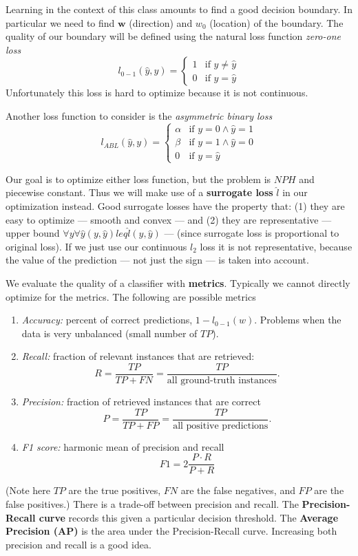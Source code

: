 \documentclass[twoside]{article}
\newcommand\w{\mathbf{w}}
\begin{document}
Learning in the context of this class amounts to find a good decision boundary. In particular we need to find $\w$ (direction) and $w_0$ (location) of the boundary. The quality of our boundary will be defined using the natural loss function \emph{zero-one loss}
\[l_{0-1}(\hat{y}, y) = \begin{cases}
1 & \mbox{if } y \neq \hat{y} \\
0 & \mbox{if } y = \hat{y}
\end{cases}\]
Unfortunately this loss is hard to optimize because it is not continuous. 

Another loss function to consider is the \emph{asymmetric binary loss}
\[l_{ABL}(\hat{y}, y) = \begin{cases}
\alpha & \mbox{if } y = 0 \land \hat{y} = 1\\
\beta & \mbox{if } y = 1 \land \hat{y} = 0\\
0 & \mbox{if } y = \hat{y}
\end{cases}\]

Our goal is to optimize either loss function, but the problem is $NPH$ and piecewise constant. Thus we will make use of a \textbf{surrogate loss} $\hat{l}$ in our optimization instead. Good surrogate losses have the property that: (1) they are easy to optimize --- smooth and convex --- and (2) they are representative --- upper bound $\forall y \forall \hat{y} (y, \hat{y}) leq \hat{l}(y, \hat{y})$ --- (since surrogate loss is proportional to original loss). If we just use our continuous $l_2$ loss it is not representative, because the value of the prediction --- not just the sign --- is taken into account.

We evaluate the quality of a classifier with \textbf{metrics}. Typically we cannot directly optimize for the metrics. The following are possible metrics

\begin{enumerate}
\item \emph{Accuracy:} percent of correct predictions, $1 - l_{0-1}(w)$. Problems when the data is very unbalanced (small number of $TP$). 
\item \emph{Recall:} fraction of relevant instances that are retrieved:
\[R = \frac{TP}{TP + FN} = \frac{TP}{\mbox{all ground-truth instances}}.\]
\item \emph{Precision:} fraction of retrieved instances that are correct
\[P = \frac{TP}{TP + FP} = \frac{TP}{\mbox{all positive predictions}}.\]
\item \emph{F1 score: } harmonic mean of precision and recall
\[F1 = 2\frac{P \cdot R}{P + R}\]
\end{enumerate}
(Note here $TP$ are the true positives, $FN$ are the false negatives, and $FP$ are the false positives.) There is a trade-off between precision and recall. The \textbf{Precision-Recall curve} records this given a particular decision threshold. The \textbf{Average Precision (AP)} is the area under the Precision-Recall curve. Increasing both precision and recall is a good idea.
\end{document}
